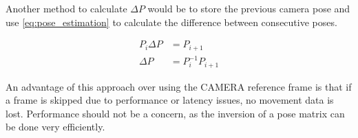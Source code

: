 Another method to calculate $\Delta P$ would be to store the previous camera pose
and use \cref{eq:pose_estimation} to calculate the difference between consecutive poses.

\begin{equation}
\begin{split}
P_i \Delta P &= P_{i+1}\\
\Delta P &= P_i^{-1} P_{i+1}
\end{split}
\label{eq:pose_estimation}
\end{equation}

An advantage of this approach over using the CAMERA reference frame is that if a frame
is skipped due to performance or latency issues, no movement data is lost.
Performance should not be a concern, as the inversion of a pose matrix can be done
very efficiently.






